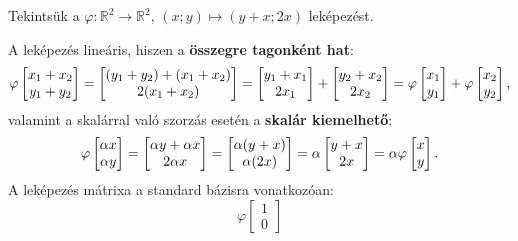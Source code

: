 \documentclass{szb-practice}
\begin{document}
\begin{example}
  Tekintsük a $\varphi: \mathbb R^2 \rightarrow \mathbb R^2$,
  $(x; y) \mapsto (y + x; 2x)$ leképezést.

  A leképezés lineáris, hiszen a \textbf{összegre tagonként hat}:
  $$
    \varphi \begin{bmatrix}
      x_1 + x_2 \\ y_1 + y_2
    \end{bmatrix} = \begin{bmatrix}
      (y_1 + y_2) + (x_1 + x_2) \\ 2 (x_1 + x_2)
    \end{bmatrix} = \begin{bmatrix}
      y_1 + x_1 \\ 2x_1
    \end{bmatrix} + \begin{bmatrix}
      y_2 + x_2 \\ 2x_2
    \end{bmatrix} = \varphi \begin{bmatrix}
      x_1 \\ y_1
    \end{bmatrix} + \varphi \begin{bmatrix}
      x_2 \\ y_2
    \end{bmatrix}
    \text,
  $$
  valamint a skalárral való szorzás esetén a \textbf{skalár kiemelhető}:
  $$
    \varphi \begin{bmatrix}
      \alpha x \\ \alpha y
    \end{bmatrix} = \begin{bmatrix}
      \alpha y + \alpha x \\ 2\alpha x
    \end{bmatrix} = \begin{bmatrix}
      \alpha(y + x) \\ \alpha(2x)
    \end{bmatrix} = \alpha \begin{bmatrix}
      y + x \\ 2x
    \end{bmatrix} = \alpha \varphi \begin{bmatrix}
      x \\ y
    \end{bmatrix}
    \text.
  $$
  A leképezés mátrixa a standard bázisra vonatkozóan:
  $$
    \varphi \begin{bmatrix} 1 \\ 0 \end{bmatrix}
$$
\end{example}
\end{document}
